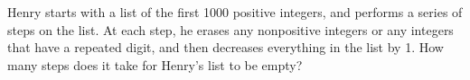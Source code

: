 Henry starts with a list of the first 1000 positive integers, and performs a series of steps on the list. At each step, he erases any nonpositive integers or any integers that have a repeated digit, and then decreases everything in the list by 1. How many steps does it take for Henry's list to be empty?
